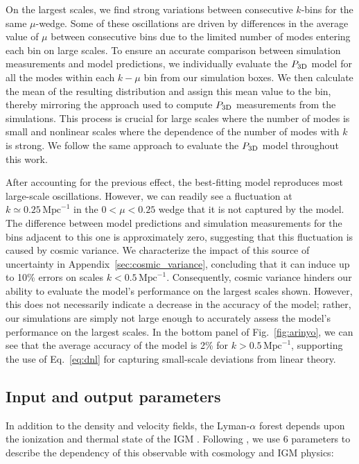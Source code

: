 \documentclass[longauth]{aa}
\newcommand{\lyaf}{Lyman-$\alpha$ forest\xspace}
\newcommand{\pthreed}{\ensuremath{P_{\rm 3D}}\xspace}
\newcommand{\iMpc}{\ensuremath{\,\mathrm{Mpc}^{-1}}}
\begin{document}
On the largest scales, we find strong variations between consecutive $k$-bins for the same $\mu$-wedge. Some of these oscillations are driven by differences in the average value of $\mu$ between consecutive bins due to the limited number of modes entering each bin on large scales. To ensure an accurate comparison between simulation measurements and model predictions, we individually evaluate the \pthreed model for all the modes within each $k-\mu$ bin from our simulation boxes. We then calculate the mean of the resulting distribution and assign this mean value to the bin, thereby mirroring the approach used to compute \pthreed measurements from the simulations. This process is crucial for large scales where the number of modes is small and nonlinear scales where the dependence of the number of modes with $k$ is strong. We follow the same approach to evaluate the \pthreed model throughout this work.

After accounting for the previous effect, the best-fitting model reproduces most large-scale oscillations. However, we can readily see a fluctuation at $k\simeq0.25\iMpc$ in the $0<\mu<0.25$ wedge that it is not captured by the model. The difference between model predictions and simulation measurements for the bins adjacent to this one is approximately zero, suggesting that this fluctuation is caused by cosmic variance. We characterize the impact of this source of uncertainty in Appendix~\ref{sec:cosmic_variance}, concluding that it can induce up to 10\% errors on scales $k<0.5\iMpc$. Consequently, cosmic variance hinders our ability to evaluate the model's performance on the largest scales shown. However, this does not necessarily indicate a decrease in the accuracy of the model; rather, our simulations are simply not large enough to accurately assess the model's performance on the largest scales. In the bottom panel of Fig.~\ref{fig:arinyo}, we can see that the average accuracy of the model is 2\% for $k>0.5\iMpc$, supporting the use of Eq.~\ref{eq:dnl} for capturing small-scale deviations from linear theory.


\subsection{Input and output parameters}
\label{sec:strategy_params}

In addition to the density and velocity fields, the \lyaf depends upon the ionization and thermal state of the IGM \citep[e.g.;][]{mcdonald2003MeasurementCosmologicalGeometry}. Following \citet{Pedersen2021}, we use 6 parameters to describe the dependency of this observable with cosmology and IGM physics:
\end{document}
